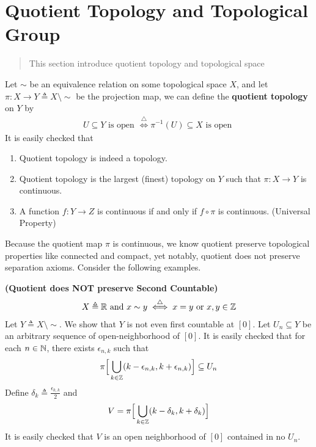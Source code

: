 \documentclass{report}
\begin{document}
\section{Quotient Topology and Topological Group}
\begin{abstract}
  This section introduce quotient topology and topological space
\end{abstract}
\begin{mdframed}
Let $\sim $ be an equivalence relation on some topological space $X$, and let $\pi:X\rightarrow Y\triangleq X\setminus \sim$ be the projection map, we can define the \textbf{quotient topology} on $Y$ by  
\begin{align*}
U\subseteq Y\text{ is open }\overset{\triangle}{\iff }\pi^{-1}(U)\subseteq X\text{ is open }
\end{align*}
It is easily checked that 
\begin{enumerate}[label=(\alph*)]
\label{quotient property}
  \item Quotient topology is indeed a topology.  
  \item Quotient topology is the largest (finest) topology on $Y$ such that $\pi:X\rightarrow Y$ is continuous. 
  \item A function $f:Y\rightarrow Z$ is continuous if and only if $f\circ \pi$ is continuous. (Universal Property)
\end{enumerate}
Because the quotient map  $\pi$ is continuous, we know quotient preserve topological properties like connected and compact, yet notably, quotient does not preserve separation axioms. Consider the following examples.
\end{mdframed}
\begin{Example}{\textbf{(Quotient does NOT preserve Second Countable)}}{}
\begin{align*}
X\triangleq \mathbb{R}\text{ and }x\sim y \overset{\triangle}{\iff }x=y\text{ or }x,y\in\mathbb{Z}
\end{align*}
Let $Y\triangleq X\setminus \sim $. We show that $Y$ is not even first countable at $[0]$. Let $U_n\subseteq Y$ be an arbitrary sequence of open-neighborhood of $[0]$. It is easily checked that for each $n\in\mathbb{N}$, there exists $\epsilon _{n,k}$ such that 
\begin{align*}
\pi \Big[ \bigcup_{k\in\mathbb{Z}} (k-\epsilon_{n,k},k+\epsilon_{n,k}) \Big] \subseteq U_n
\end{align*}
Define $\delta_k\triangleq \frac{\epsilon_{k,k}}{2}$ and 
\begin{align*}
V=\pi \Big[\bigcup_{k\in\mathbb{Z}} (k-\delta_k,k+\delta_k) \Big] 
\end{align*}
It is easily checked that $V$ is an open neighborhood of  $[0]$ contained in no $U_n$.
\end{Example}
\end{document}
